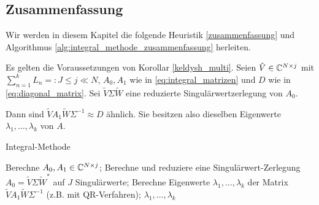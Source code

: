 \subsection*{Zusammenfassung}

Wir werden in diesem Kapitel die folgende Heuristik \ref{zusammenfassung} und Algorithmus \ref{alg:integral_methode_zusammenfassung} herleiten.

\begin{heuristics} \label{zusammenfassung}

    Es gelten die Voraussetzungen von Korollar \ref{keldysh_multi}.
    Seien $\hat V \in \mathbb{C}^{N \times j}$ mit $\sum_{n=1}^k L_n =: J \leq j \ll N$, $A_0, A_1$ wie in \eqref{eq:integral_matrizen} und $D$ wie in \eqref{eq:diagonal_matrix}.
    Sei $\tilde V \Sigma \tilde W$ eine reduzierte Singulärwertzerlegung von $A_0$.

    Dann sind $\tilde V A_1 \tilde W \Sigma^{-1} \approx D$ ähnlich.
    Sie besitzen also dieselben Eigenwerte $\lambda_1, \dots, \lambda_k$ von $A$.

\end{heuristics}

\begin{algorithm}[H]
	\caption{Integral-Methode}
    \begin{algorithmic}[1]
            \State Berechne $A_0, A_1 \in \mathbb{C}^{N \times j}$;
            \State Berechne und reduziere eine Singulärwert-Zerlegung $A_0 = \tilde V \Sigma \tilde W^\ast$ auf $J$ Singulärwerte;
            \State Berechne Eigenwerte $\lambda_1, \dots, \lambda_k$ der Matrix $\tilde V A_1 \tilde W \Sigma^{-1}$ (z.B. mit QR-Verfahren);
            \State \Return $\lambda_1, \dots, \lambda_k$
		\EndProcedure
    \end{algorithmic}
    \caption{}
    \label{alg:integral_methode_zusammenfassung}
\end{algorithm}
